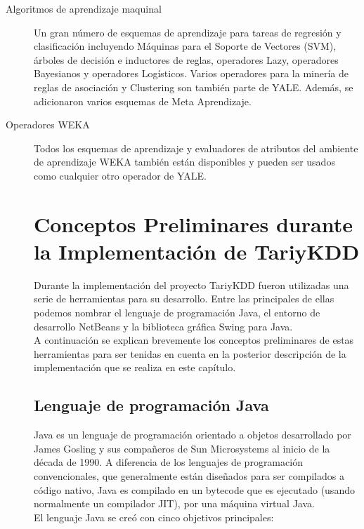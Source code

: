 \begin{description}
\item [Algoritmos de aprendizaje maquinal] Un gran n\'umero de esquemas de aprendizaje para tareas de regresi\'on
y clasificaci\'on incluyendo M\'aquinas para el Soporte de Vectores (SVM), \'arboles de decisi\'on e inductores
de reglas, operadores Lazy, operadores Bayesianos y operadores Log\'isticos. Varios operadores para la miner\'ia
de reglas de asociaci\'on y Clustering son tambi\'en parte de YALE.  Adem\'as, se adicionaron varios esquemas de
Meta Aprendizaje.

\item [Operadores WEKA] Todos los esquemas de aprendizaje y evaluadores de atributos del ambiente de aprendizaje
WEKA tambi\'en est\'an disponibles y pueden ser usados como cualquier otro operador de YALE.

\section{Conceptos Preliminares durante la Implementaci\'on de TariyKDD}
Durante la implementaci\'on del proyecto TariyKDD fueron utilizadas una serie de herramientas para su desarrollo.  Entre las principales de ellas podemos nombrar el lenguaje de programaci\'on Java, el entorno de desarrollo NetBeans y la biblioteca gr\'afica Swing para Java.\\

A continuaci\'on se explican brevemente los conceptos preliminares de estas herramientas para ser tenidas en cuenta en la posterior descripci\'on de la implementaci\'on que se realiza en este cap\'itulo.

\subsection{Lenguaje de programaci\'on Java}
Java es un lenguaje de programaci\'on orientado a objetos desarrollado por James Gosling y sus compa\~neros de Sun Microsystems al inicio de la d\'ecada de 1990. A diferencia de los lenguajes de programaci\'on convencionales, que generalmente est\'an dise\~nados para ser compilados a c\'odigo nativo, Java es compilado en un bytecode que es ejecutado (usando normalmente un compilador JIT), por una m\'aquina virtual Java.\\

El lenguaje Java se cre\'o con cinco objetivos principales:


\end{description}
